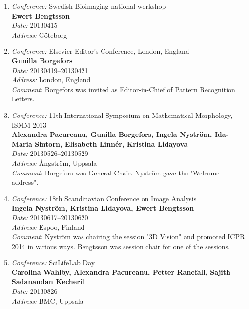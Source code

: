\begin{enumerate}
\item 
{\em Conference:} Swedish Bioimaging national workshop~\\
{\bf Ewert Bengtsson}~\\
{\em Date:} 20130415~\\
{\em Address:} G\"{o}teborg

\item 
{\em Conference:} Elsevier Editor's Conference, London, England~\\
{\bf Gunilla Borgefors}~\\
{\em Date:} 20130419--20130421~\\
{\em Address:} London, England~\\
{\em Comment:} Borgefors was invited as Editor-in-Chief of Pattern Recognition Letters.

\item 
{\em Conference:} 11th International Symposium on Mathematical Morphology, ISMM 2013~\\
{\bf Alexandra Pacureanu, Gunilla Borgefors, Ingela Nystr\"{o}m, Ida-Maria Sintorn, Elisabeth Linn\'{e}r, Kristina Lidayova}~\\
{\em Date:} 20130526--20130529~\\
{\em Address:} {\AA}ngstr\"{o}m, Uppsala~\\
{\em Comment:} Borgefors was General Chair. Nystr\"{o}m gave the "Welcome address".

\item 
{\em Conference:} 18th Scandinavian Conference on Image Analysis~\\
{\bf Ingela Nystr\"{o}m, Kristina Lidayova, Ewert Bengtsson}~\\
{\em Date:} 20130617--20130620~\\
{\em Address:} Espoo, Finland~\\
{\em Comment:} Nystr\"{o}m was chairing the session "3D Vision" and promoted ICPR 2014 in various ways. Bengtsson was session chair for one of the sessions.

\item 
{\em Conference:} SciLifeLab Day~\\
{\bf Carolina Wahlby, Alexandra Pacureanu, Petter Ranefall, Sajith Sadanandan Kecheril}~\\
{\em Date:} 20130826~\\
{\em Address:} BMC, Uppsala


\end{enumerate}
